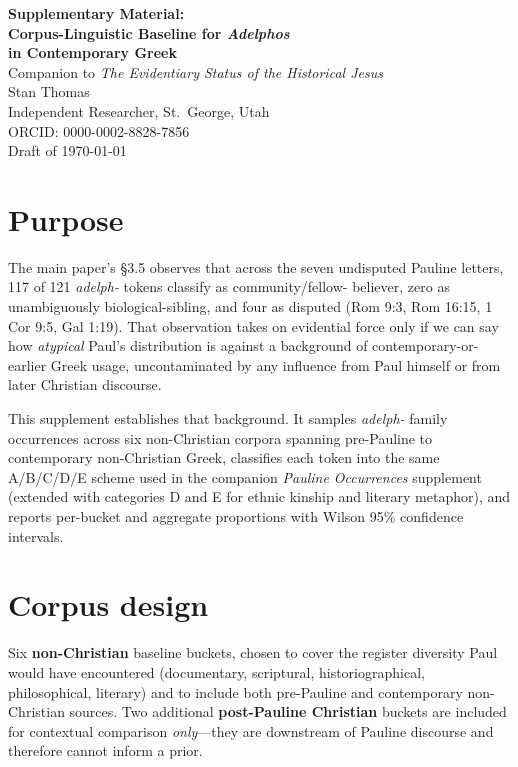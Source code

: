 \documentclass[11pt,oneside]{article}
\begin{document}
\begin{center}
  {\LARGE\bfseries Supplementary Material:\\[4pt]
   Corpus-Linguistic Baseline for \textit{Adelphos}\\[2pt]
   in Contemporary Greek}\\[18pt]
  {\large Companion to \textit{The Evidentiary Status of the Historical Jesus}}\\[6pt]
  {\normalsize Stan Thomas}\\[4pt]
  {\normalsize Independent Researcher, St.\ George, Utah\\
   ORCID: 0000-0002-8828-7856}\\[12pt]
  {\normalsize Draft of \today}
\end{center}

\vspace{0.5em}

\section*{Purpose}

The main paper's §3.5 observes that across the seven undisputed Pauline
letters, 117 of 121 \textit{adelph-} tokens classify as community/fellow-
believer, zero as unambiguously biological-sibling, and four as disputed
(Rom 9:3, Rom 16:15, 1 Cor 9:5, Gal 1:19).  That observation takes on
evidential force only if we can say how \textit{atypical} Paul's
distribution is against a background of contemporary-or-earlier Greek
usage, uncontaminated by any influence from Paul himself or from later
Christian discourse.

This supplement establishes that background.  It samples
\textit{adelph-} family occurrences across six non-Christian corpora
spanning pre-Pauline to contemporary non-Christian Greek, classifies
each token into the same A/B/C/D/E scheme used in the companion
\textit{Pauline Occurrences} supplement (extended with categories D and
E for ethnic kinship and literary metaphor), and reports per-bucket and
aggregate proportions with Wilson 95\% confidence intervals.

\section*{Corpus design}

Six \textbf{non-Christian} baseline buckets, chosen to cover the
register diversity Paul would have encountered (documentary,
scriptural, historiographical, philosophical, literary) and to include
both pre-Pauline and contemporary non-Christian sources.  Two
additional \textbf{post-Pauline Christian} buckets are included for
contextual comparison \textit{only}---they are downstream of Pauline
discourse and therefore cannot inform a prior.
\end{document}
